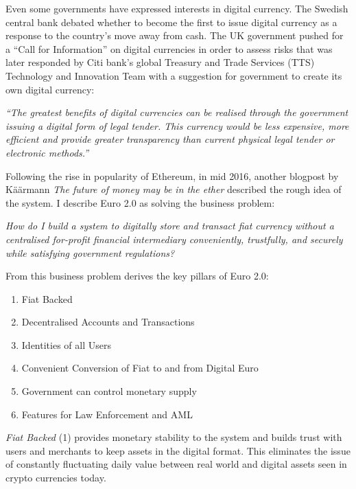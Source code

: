\documentclass[12pt]{article} %
\begin{document}
{{Even some governments have expressed interests in digital currency. The Swedish central bank debated whether to become the first to issue digital currency as a response to the country's move away from cash\cite{milne2016sweden}. The UK government pushed for a ``Call for Information'' on digital currencies in order to assess risks\cite{nermin2014ukcall} that was later responded by Citi bank's global Treasury and Trade Services (TTS) Technology and Innovation Team with a suggestion for government to create its own digital currency\cite{spaven2015ukcurrency}:

\begin{quoting}
	\textit{``The greatest benefits of digital currencies can be realised through the government issuing a digital form of legal tender. This currency would be less expensive, more efficient and provide greater transparency than current physical legal tender or electronic methods.''}
\end{quoting}

Following the rise in popularity of Ethereum, in mid 2016, another blogpost by Käärmann \textit{The future of money may be in the ether}\cite{kaarmann2016ether} described the rough idea of the system. I describe Euro 2.0 as solving the business problem:

\begin{quoting}
	\textit{How do I build a system to digitally store and transact fiat currency without a centralised for-profit financial intermediary conveniently, trustfully, and securely while satisfying government regulations?}
\end{quoting}

From this business problem derives the key pillars of Euro 2.0:

\begin{enumerate}
	\item Fiat Backed
	\item Decentralised Accounts and Transactions
	\item Identities of all Users
	\item Convenient Conversion of Fiat to and from Digital Euro
	\item Government can control monetary supply
	\item Features for Law Enforcement and AML
\end{enumerate}

\textit{Fiat Backed} (1) provides monetary stability to the system and builds trust with users and merchants to keep assets in the digital format. This eliminates the issue of constantly fluctuating daily value between real world and digital assets seen in crypto currencies today.

}}
\end{document}
